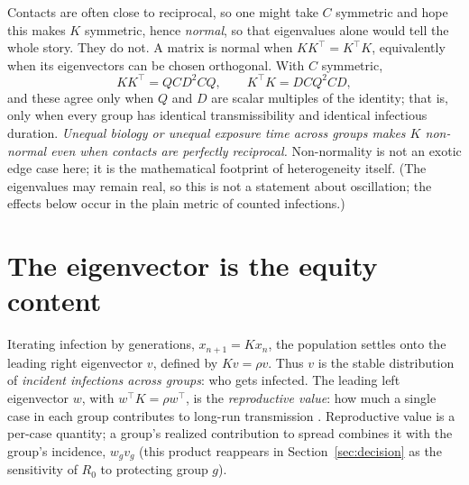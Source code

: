 \documentclass[12pt]{article}
\begin{document}
Contacts are often close to reciprocal, so one might take $C$ symmetric and hope this makes $K$ symmetric, hence \emph{normal}, so that eigenvalues alone would tell the whole story. They do not. A matrix is normal when $KK^{\top}=K^{\top}K$, equivalently when its eigenvectors can be chosen orthogonal. With $C$ symmetric,
\begin{equation}
KK^{\top}=QCD^{2}CQ,\qquad K^{\top}K=DCQ^{2}CD,
\end{equation}
and these agree only when $Q$ and $D$ are scalar multiples of the identity; that is, only when every group has identical transmissibility and identical infectious duration. \emph{Unequal biology or unequal exposure time across groups makes $K$ non-normal even when contacts are perfectly reciprocal.} Non-normality is not an exotic edge case here; it is the mathematical footprint of heterogeneity itself. (The eigenvalues may remain real, so this is not a statement about oscillation; the effects below occur in the plain metric of counted infections.)

\section{The eigenvector is the equity content}\label{sec:equity}

Iterating infection by generations, $x_{n+1}=Kx_{n}$, the population settles onto the leading right eigenvector $v$, defined by $Kv=\rho v$. Thus $v$ is the stable distribution of \emph{incident infections across groups}: who gets infected. The
leading left eigenvector $w$, with $w^{\top}K=\rho w^{\top}$, is the \emph{reproductive value}: how much a single case in each group contributes to long-run transmission \cite{caswell2001}. Reproductive value is a per-case quantity; a group's realized contribution to spread combines it with the group's incidence, $w_g v_g$ (this product reappears in Section~\ref{sec:decision} as the sensitivity of $R_0$ to protecting group $g$).
\end{document}
